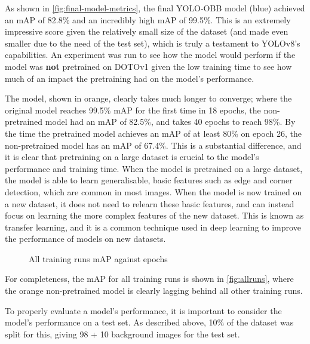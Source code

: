 As shown in \autoref{fig:final-model-metrics}, the final YOLO-OBB model (blue) achieved an mAP of 82.8\% and an incredibly high mAP of 99.5\%. This is an extremely impressive score given the relatively small size of the dataset (and made even smaller due to the need of the test set), which is truly a testament to YOLOv8's capabilities. An experiment was run to see how the model would perform if the model was \textbf{not} pretrained on DOTOv1 \cite{9560031} given the low training time to see how much of an impact the pretraining had on the model's performance. 

The model, shown in orange, clearly takes much longer to converge; where the original model reaches 99.5\% mAP for the first time in 18 epochs, the non-pretrained model had an mAP of 82.5\%, and takes 40 epochs to reach 98\%. By the time the pretrained model achieves an mAP of at least 80\% on epoch 26, the non-pretrained model has an mAP of 67.4\%. This is a substantial difference, and it is clear that pretraining on a large dataset is crucial to the model's performance and training time. When the model is pretrained on a large dataset, the model is able to learn generalisable, basic features such as edge and corner detection, which are common in most images. When the model is now trained on a new dataset, it does not need to relearn these basic features, and can instead focus on learning the more complex features of the new dataset. This is known as transfer learning, and it is a common technique used in deep learning to improve the performance of models on new datasets.

\begin{figure}[H]
  \centering
  
  \caption{All training runs mAP against epochs}
  \label{fig:allruns}
\end{figure}

For completeness, the mAP for all training runs is shown in \autoref{fig:allruns}, where the orange non-pretrained model is clearly lagging behind all other training runs.

To properly evaluate a model's performance, it is important to consider the model's performance on a test set. As described above, 10\% of the dataset was split for this, giving 98 + 10 background images for the test set.

